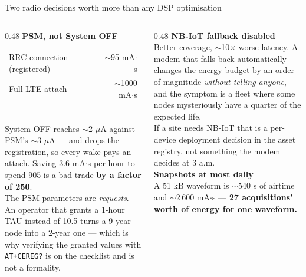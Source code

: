 \documentclass[aspectratio=169,10pt]{beamer}
\begin{document}
\begin{frame}{Two radio decisions worth more than any DSP optimisation}
  \begin{columns}[T]
    \begin{column}{0.48\textwidth}
      \small\textbf{PSM, not System OFF}
      \\[1.5mm]
      \scriptsize
      \begin{tabular}{@{}lr@{}}
        \toprule
        RRC connection (registered) & $\sim$95 mA$\cdot$s \\
        Full LTE attach             & $\sim$1000 mA$\cdot$s \\
        \bottomrule
      \end{tabular}
      \\[2mm]
      System OFF reaches $\sim$2 $\mu$A against PSM's $\sim$3 $\mu$A --- and
      drops the registration, so every wake pays an attach. Saving 3.6
      mA$\cdot$s per hour to spend 905 is a bad trade \textbf{by a factor of
      250}.
      \\[1.5mm]
      The PSM parameters are \emph{requests}. An operator that grants a 1-hour
      TAU instead of 10.5 turns a 9-year node into a 2-year one --- which is why
      verifying the granted values with \texttt{AT+CEREG?} is on the checklist
      and is not a formality.
    \end{column}
    \begin{column}{0.48\textwidth}
      \small\textbf{NB-IoT fallback disabled}
      \\[1.5mm]
      \scriptsize
      Better coverage, $\sim$10$\times$ worse latency. A modem that falls back
      automatically changes the energy budget by an order of magnitude
      \emph{without telling anyone}, and the symptom is a fleet where some nodes
      mysteriously have a quarter of the expected life.
      \\[1.5mm]
      If a site needs NB-IoT that is a per-device deployment decision in the
      asset registry, not something the modem decides at 3 a.m.
      \\[2.5mm]
      \small\textbf{Snapshots at most daily}
      \\[1mm]
      \scriptsize
      A 51 kB waveform is $\sim$540 s of airtime and $\sim$2\,600 mA$\cdot$s ---
      \textbf{27 acquisitions' worth of energy for one waveform.}
    \end{column}
  \end{columns}
\end{frame}
\end{document}
